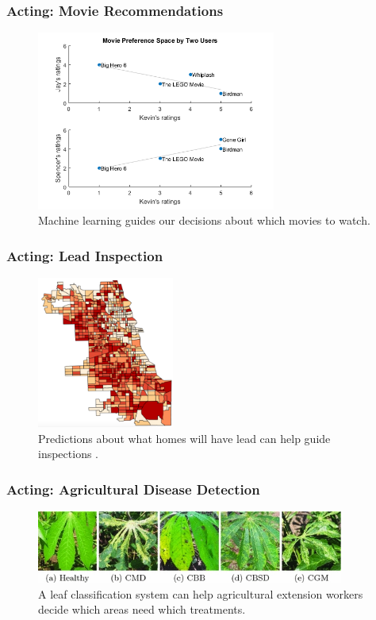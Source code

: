 \documentclass[10pt,mathserif]{beamer}
\begin{document}
\begin{frame}
  \frametitle{Acting: Movie Recommendations}
  \begin{figure}[ht]
    \centering
    \includegraphics[width=0.7\textwidth]{figures/netflix_regression}
    \caption{Machine learning guides our decisions about which movies to watch.}
  \end{figure}
\end{frame}

\begin{frame}
  \frametitle{Acting: Lead Inspection}
  \begin{figure}[ht]
    \centering
    \includegraphics[width=0.4\textwidth]{figures/lead_inspection}
    \caption{Predictions about what homes will have lead can help guide
      inspections \citep{potash2015predictive}. \label{fig:potash_predictive} }
  \end{figure}
\end{frame}

\begin{frame}
  \frametitle{Acting: Agricultural Disease Detection}
  \begin{figure}[ht]
    \centering
    \includegraphics[width=0.9\textwidth]{figures/cassava}
    \caption{A leaf classification system can help agricultural extension
      workers decide which areas need which treatments. \label{fig:cassava} }
  \end{figure}

\end{frame}
\end{document}
